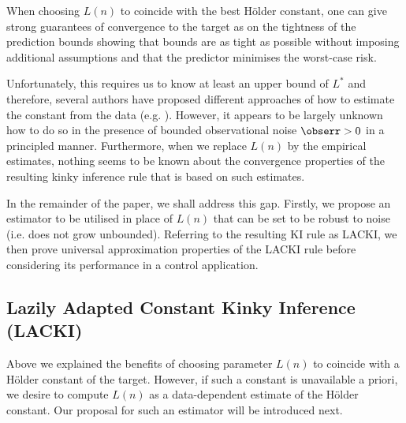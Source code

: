 

When choosing $L(n)$ to coincide with the best H\"older constant, one can give strong guarantees of convergence to the target as on the tightness of the prediction bounds  \cite{Sukharev1978,calliess2014_thesis} showing that bounds are as tight as possible without imposing additional assumptions and that the predictor minimises the worst-case risk.

Unfortunately, this requires us to know at least an upper bound of $L^*$ and therefore, several authors have proposed different approaches of how to estimate the constant from the data (e.g. \cite{Strongin1973,Wood1996}). However, it appears to be largely unknown how to do so in the presence of bounded observational noise $\obserr >0$ in a principled manner. Furthermore, when we replace $L(n)$ by the empirical estimates, nothing seems to be known about the convergence properties of the resulting kinky inference rule that is based on such  estimates.  

In the remainder of the paper, we shall address this gap. Firstly, we propose an estimator to be utilised in place of $L(n)$ that can be set to be robust to noise (i.e. does not grow unbounded). Referring to the resulting KI rule as LACKI, we then prove universal approximation properties of the LACKI rule before considering its performance in a control application.


\subsection{Lazily Adapted Constant Kinky Inference (LACKI)}
\label{sec:lacki}
Above we explained the benefits of choosing parameter $L(n)$ to coincide with a H\"older constant of the target. 
However, if such a constant is unavailable a priori, we desire to compute $L(n)$ as a data-dependent estimate of the H\"older constant. Our proposal for such an estimator will be introduced next. 

